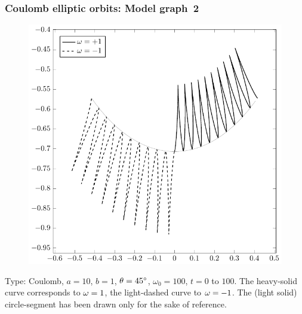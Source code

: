 \subsubsection*{Coulomb elliptic orbits: Model graph~2} 
\begin{figure}[H]
\centering
\includegraphics[scale=.4]{src/images/lbk-graphics/larm-c-10-1-45-1-100.pdf}
\caption*{}
\end{figure}

Type: Coulomb, $a = 10$, $b =1$, ${\theta} = \ang{45}$, 
$\omega_0 = 100$, $t =0$ to $100$. The heavy-solid curve 
corresponds to ${\omega} = 1$, the light-dashed curve to ${\omega} = 
-1$. The (light solid) circle-segment has been drawn only 
for the sake of reference. 

\vspace{-.2cm}

